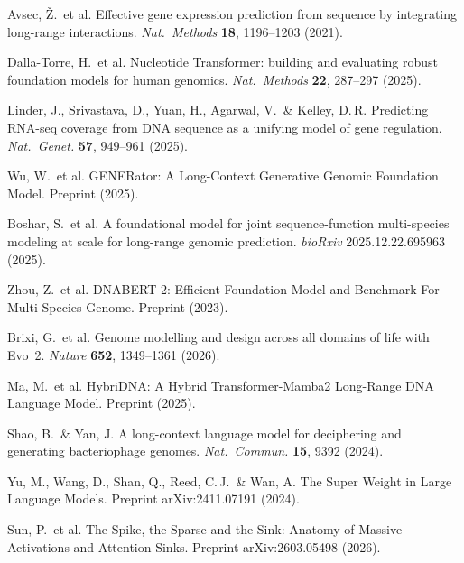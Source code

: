 \documentclass[11pt]{article}
\begin{document}
\begin{enumerate}[leftmargin=*,label={[\arabic*]}]

\item Avsec, \v{Z}.\ et al. Effective gene expression prediction
from sequence by integrating long-range interactions.
\textit{Nat.\ Methods} \textbf{18}, 1196--1203 (2021).

\item Dalla-Torre, H.\ et al. Nucleotide Transformer: building and
evaluating robust foundation models for human genomics.
\textit{Nat.\ Methods} \textbf{22}, 287--297 (2025).

\item Linder, J., Srivastava, D., Yuan, H., Agarwal, V.\ \&
Kelley, D.\,R. Predicting RNA-seq coverage from DNA sequence as a
unifying model of gene regulation. \textit{Nat.\ Genet.}
\textbf{57}, 949--961 (2025).

\item Wu, W.\ et al. GENERator: A Long-Context Generative Genomic
Foundation Model. Preprint (2025).

\item Boshar, S.\ et al. A foundational model for joint
sequence-function multi-species modeling at scale for long-range
genomic prediction. \textit{bioRxiv} 2025.12.22.695963 (2025).

\item Zhou, Z.\ et al. DNABERT-2: Efficient Foundation Model and
Benchmark For Multi-Species Genome. Preprint (2023).

\item Brixi, G.\ et al. Genome modelling and design across all
domains of life with Evo~2. \textit{Nature} \textbf{652},
1349--1361 (2026).

\item Ma, M.\ et al. HybriDNA: A Hybrid Transformer-Mamba2
Long-Range DNA Language Model. Preprint (2025).

\item Shao, B.\ \& Yan, J. A long-context language model for
deciphering and generating bacteriophage genomes.
\textit{Nat.\ Commun.} \textbf{15}, 9392 (2024).

\item Yu, M., Wang, D., Shan, Q., Reed, C.\,J.\ \& Wan, A. The
Super Weight in Large Language Models. Preprint arXiv:2411.07191
(2024).

\item Sun, P.\ et al. The Spike, the Sparse and the Sink: Anatomy
of Massive Activations and Attention Sinks. Preprint
arXiv:2603.05498 (2026).

\end{enumerate}
\end{document}
